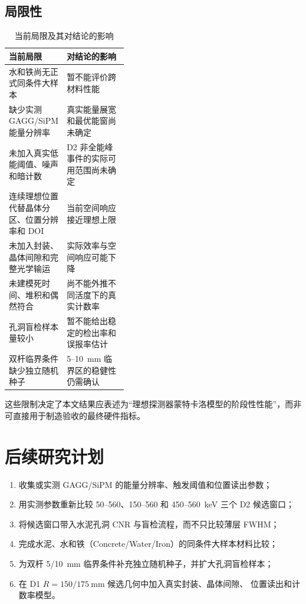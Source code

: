 \documentclass[UTF8,a4paper,zihao=-4,fontset=fandol]{ctexart}
\begin{document}
\subsection{局限性}

\begin{table}[htbp]
  \centering
  \caption{当前局限及其对结论的影响}
  \label{tab:limitations}
  \small
  \begin{tabularx}{\linewidth}{@{}p{0.40\linewidth}Y@{}}
    \toprule
    当前局限 & 对结论的影响 \\
    \midrule
    水和铁尚无正式同条件大样本 & 暂不能评价跨材料性能 \\
    缺少实测 GAGG/SiPM 能量分辨率 & 真实能量展宽和最优能窗尚未确定 \\
    未加入真实低能阈值、噪声和暗计数 & D2 非全能峰事件的实际可用范围尚未确定 \\
    连续理想位置代替晶体分区、位置分辨率和 DOI & 当前空间响应接近理想上限 \\
    未加入封装、晶体间隙和完整光学输运 & 实际效率与空间响应可能下降 \\
    未建模死时间、堆积和偶然符合 & 尚不能外推不同活度下的真实计数率 \\
    孔洞盲检样本量较小 & 暂不能给出稳定的检出率和误报率估计 \\
    双杆临界条件缺少独立随机种子 & 5--10~mm 临界区的稳健性仍需确认 \\
    \bottomrule
  \end{tabularx}
\end{table}

这些限制决定了本文结果应表述为“理想探测器蒙特卡洛模型的阶段性性能”，而非
可直接用于制造验收的最终硬件指标。

\section{后续研究计划}

\begin{enumerate}
  \item 收集或实测 GAGG/SiPM 的能量分辨率、触发阈值和位置读出参数；
  \item 用实测参数重新比较 50--560、150--560 和 450--560~keV 三个 D2 候选窗口；
  \item 将候选窗口带入水泥孔洞 CNR 与盲检流程，而不只比较薄层 FWHM；
  \item 完成水泥、水和铁（Concrete/Water/Iron）的同条件大样本材料比较；
  \item 为双杆 5/10~mm 临界条件补充独立随机种子，并扩大孔洞盲检样本；
  \item 在 D1 $R=150/175~\mathrm{mm}$ 候选几何中加入真实封装、晶体间隙、
  位置读出和计数率模型。
\end{enumerate}
\end{document}
